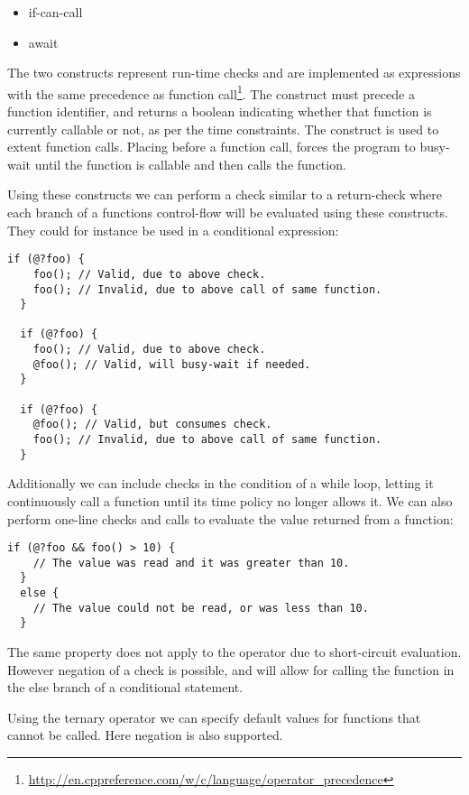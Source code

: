 \begin{itemize}
  \item if-can-call 
  \item await 
\end{itemize}

The two constructs represent run-time checks and are implemented as expressions with the same precedence as function call\footnote{\url{http://en.cppreference.com/w/c/language/operator_precedence}}.
The  construct must precede a function identifier, and returns a boolean indicating whether that function is currently callable or not, as per the time constraints.
The  construct is used to extent function calls. Placing  before a function call, forces the program to busy-wait until the function is callable and then calls the function.

Using these constructs we can perform a check similar to a return-check where each branch of a functions control-flow will be evaluated using these constructs.
They could for instance be used in a conditional expression:
\begin{lstlisting}[style=dlmc]
  if (@?foo) {
    foo(); // Valid, due to above check.
    foo(); // Invalid, due to above call of same function.
  }

  if (@?foo) {
    foo(); // Valid, due to above check.
    @foo(); // Valid, will busy-wait if needed.
  }

  if (@?foo) {
    @foo(); // Valid, but consumes check.
    foo(); // Invalid, due to above call of same function.
  }
\end{lstlisting}
Additionally we can include checks in the condition of a while loop, letting it continuously call a function until its time policy no longer allows it.
We can also perform one-line checks and calls to evaluate the value returned from a function:
\begin{lstlisting}[style=dlmc]
  if (@?foo && foo() > 10) {
    // The value was read and it was greater than 10.
  }
  else {
    // The value could not be read, or was less than 10.
  }
\end{lstlisting}
The same property does not apply to the \dlmc{||} operator due to short-circuit evaluation.
However negation of a  check is possible, and will allow for calling the function in the else branch of a conditional statement.

Using the ternary operator we can specify default values for functions that cannot be called.
Here negation is also supported.

